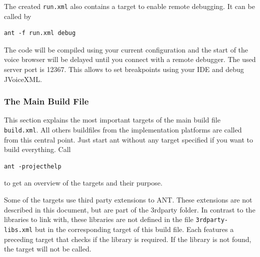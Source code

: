 \documentclass[11pt,a4paper]{article}
\begin{document}
The created \texttt{run.xml} also contains a target to enable remote
debugging. It can be called by
\begin{lstlisting}
ant -f run.xml debug
\end{lstlisting}
The code will be compiled using your current configuration and the start of the
voice browser will be delayed until you connect with a remote debugger. The
used server port is 12367. This allows to set breakpoints using your IDE and
debug JVoiceXML.

\subsubsection{The Main Build File}
\label{sec:ant-build-file}

This section explains the most important targets of the main build file
\texttt{build.xml}. All others buildfiles from the implementation platforms
are called from this central point. Just start ant without any target specified
if you want to build everything. Call
\begin{lstlisting}
ant -projecthelp
\end{lstlisting}
to get an overview of the targets and their purpose.

Some of the targets use third party extensions to ANT. These 
extensions are not described in this document, but are part of
the 3rdparty folder. In contrast to the libraries to link with,
these libraries are not defined in the file \texttt{3rdparty-libs.xml}
but in the corresponding target of this build file. Each features
a preceding target that checks if the library is required. If
the library is not found, the target will not be called.
\end{document}
